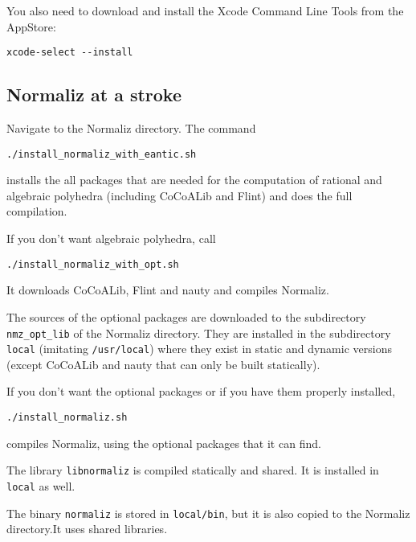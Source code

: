 \documentclass[12pt,a4paper]{scrartcl}
\theoremstyle{definition}
\begin{document}
You also need to download and install the Xcode Command Line Tools from the AppStore:
\begin{Verbatim}
xcode-select --install
\end{Verbatim} 

\subsection{Normaliz at a stroke}\label{stroke}

Navigate to the Normaliz directory. The command
\begin{Verbatim}
./install_normaliz_with_eantic.sh
\end{Verbatim}
installs the all packages that are needed for the computation of rational and algebraic polyhedra (including CoCoALib and Flint) and does the full compilation.

If you don't want algebraic polyhedra, call
\begin{Verbatim}
./install_normaliz_with_opt.sh
\end{Verbatim}
It downloads CoCoALib, Flint and nauty and compiles Normaliz.

The sources of the optional packages are downloaded to the subdirectory \verb|nmz_opt_lib| of the Normaliz directory. They are installed in the subdirectory \verb|local| (imitating \verb|/usr/local|) where they exist in static and dynamic versions (except CoCoALib and nauty that can only be built statically).

If you don't want the optional packages or if you have them properly installed,
\begin{Verbatim}
./install_normaliz.sh
\end{Verbatim}
compiles Normaliz, using the optional packages that it can find. 

The library \verb|libnormaliz| is compiled statically and shared. It is installed in \verb|local| as well. 

The binary \verb|normaliz| is stored in \verb|local/bin|, but it is also copied to the Normaliz directory.It uses shared libraries.
\end{document}
